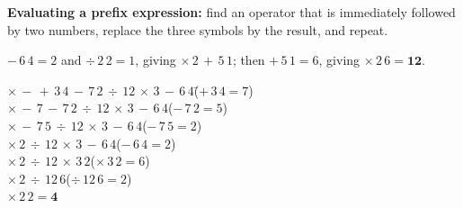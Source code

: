\documentclass{fkt-notes}
\theoremstyle{definition}
\begin{document}
\begin{rulepar}
  \textbf{Evaluating a prefix expression:} find an operator that is
  immediately followed by two numbers, replace the three symbols by the
  result, and repeat.
\end{rulepar}

\begin{example}
  $-\,6\,4=2$ and $\div\,2\,2=1$, giving $\times\,2\,+\,5\,1$; then
  $+\,5\,1=6$, giving $\times\,2\,6=\mathbf{12}$.
\end{example}
\begin{example}
  \leavevmode\par\noindent
  \begin{tabbing}
    $\times\,-\,+\,3\,4\,-\,7\,2\,\div\,12\,\times\,3\,-\,6\,4$\quad\=($+\,3\,4=7$)\\
    $\times\,-\,7\,-\,7\,2\,\div\,12\,\times\,3\,-\,6\,4$\>($-\,7\,2=5$)\\
    $\times\,-\,7\,5\,\div\,12\,\times\,3\,-\,6\,4$\>($-\,7\,5=2$)\\
    $\times\,2\,\div\,12\,\times\,3\,-\,6\,4$\>($-\,6\,4=2$)\\
    $\times\,2\,\div\,12\,\times\,3\,2$\>($\times\,3\,2=6$)\\
    $\times\,2\,\div\,12\,6$\>($\div\,12\,6=2$)\\
    $\times\,2\,2=\mathbf{4}$
  \end{tabbing}
\end{example}
\end{document}
